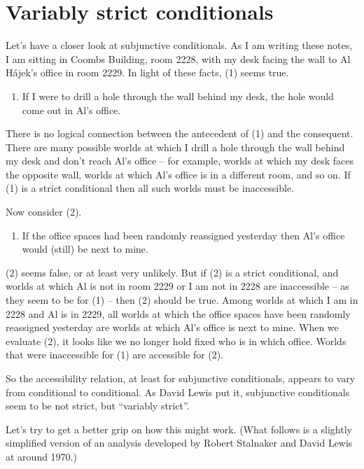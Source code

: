   
\section{Variably strict conditionals}

Let's have a closer look at subjunctive conditionals. As I am writing these
notes, I am sitting in Coombs Building, room 2228, with my desk facing
the wall to Al H\'ajek's office in room 2229. In light of these facts, (1) seems
true.
\begin{enumerate}[leftmargin=10mm]
\item[(1)] If I were to drill a hole through the wall behind my desk,
  the hole would come out in Al's office.
\end{enumerate}
There is no logical connection between the antecedent of (1) and the consequent.
There are many possible worlds at which I drill a hole through the wall behind
my desk and don't reach Al's office -- for example, worlds at which my desk
faces the opposite wall, worlds at which Al's office is in a different room, and
so on. If (1) is a strict conditional then all such worlds must be inaccessible.

Now consider (2).
\begin{enumerate}[leftmargin=10mm]
\item[(2)] If the office spaces had been randomly reassigned yesterday then Al's
  office would (still) be next to mine.
\end{enumerate}
(2) seems false, or at least very unlikely. But if (2) is a strict conditional,
and worlds at which Al is not in room 2229 or I am not in 2228 are inaccessible
-- as they seem to be for (1) -- then (2) should be true. Among worlds at which
I am in 2228 and Al is in 2229, all worlds at which the office spaces have been
randomly reassigned yesterday are worlds at which Al's office is next to mine.
When we evaluate (2), it looks like we no longer hold fixed who is in which
office. Worlds that were inaccessible for (1) are accessible for (2).

So the accessibility relation, at least for subjunctive conditionals, appears to
vary from conditional to conditional. As David Lewis put it, subjunctive
conditionals seem to be not strict, but ``variably strict''.

Let's try to get a better grip on how this might work. (What follows is a
slightly simplified version of an analysis developed by Robert Stalnaker and
David Lewis at around 1970.)

